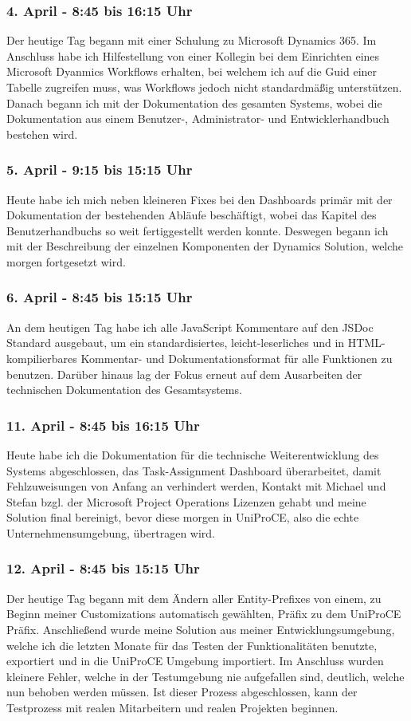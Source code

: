 \subsubsection*{4. April - 8:45 bis 16:15 Uhr}
Der heutige Tag begann mit einer Schulung zu Microsoft Dynamics 365. Im Anschluss habe ich Hilfestellung von einer Kollegin bei dem Einrichten eines Microsoft Dyanmics Workflows erhalten, bei welchem ich auf die Guid einer Tabelle zugreifen muss, was Workflows jedoch nicht standardmäßig unterstützen. Danach begann ich mit der Dokumentation des gesamten Systems, wobei die Dokumentation aus einem Benutzer-, Administrator- und Entwicklerhandbuch bestehen wird.

\subsubsection*{5. April - 9:15 bis 15:15 Uhr}
Heute habe ich mich neben kleineren Fixes bei den Dashboards primär mit der Dokumentation der bestehenden Abläufe beschäftigt, wobei das Kapitel des Benutzerhandbuchs so weit fertiggestellt werden konnte. Deswegen begann ich mit der Beschreibung der einzelnen Komponenten der Dynamics Solution, welche morgen fortgesetzt wird.

\subsubsection*{6. April - 8:45 bis 15:15 Uhr}
An dem heutigen Tag habe ich alle JavaScript Kommentare auf den JSDoc Standard ausgebaut, um ein standardisiertes, leicht-leserliches und in HTML-kompilierbares Kommentar- und Dokumentationsformat für alle Funktionen zu benutzen. Darüber hinaus lag der Fokus erneut auf dem Ausarbeiten der technischen Dokumentation des Gesamtsystems.

\subsubsection*{11. April - 8:45 bis 16:15 Uhr}
Heute habe ich die Dokumentation für die technische Weiterentwicklung des Systems abgeschlossen, das Task-Assignment Dashboard überarbeitet, damit Fehlzuweisungen von Anfang an verhindert werden, Kontakt mit Michael und Stefan bzgl. der Microsoft Project Operations Lizenzen gehabt und meine Solution final bereinigt, bevor diese morgen in UniProCE, also die echte Unternehmensumgebung, übertragen wird.

\subsubsection*{12. April - 8:45 bis 15:15 Uhr}
Der heutige Tag begann mit dem Ändern aller Entity-Prefixes von einem, zu Beginn meiner Customizations automatisch gewählten, Präfix zu dem UniProCE Präfix. Anschließend wurde meine Solution aus meiner Entwicklungsumgebung, welche ich die letzten Monate für das Testen der Funktionalitäten benutzte, exportiert und in die UniProCE Umgebung importiert. Im Anschluss wurden kleinere Fehler, welche in der Testumgebung nie aufgefallen sind, deutlich, welche nun behoben werden müssen. Ist dieser Prozess abgeschlossen, kann der Testprozess mit realen Mitarbeitern und realen Projekten beginnen.

